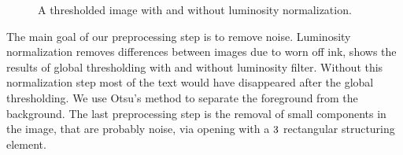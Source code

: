 \begin{figure}[b!]
	\centering
	\hfil
	\caption{A thresholded image with \protect{} and without \protect{} luminosity normalization.}
	\label{fig:methods:preprocessing:lumNormalization}
\end{figure}

The main goal of our preprocessing step is to remove noise. 
Luminosity normalization removes differences between images due to worn off ink,  shows the results of global thresholding with and without luminosity filter. Without this normalization step most of the text would have disappeared after the global thresholding. 
We use Otsu's \cite{otsu1975threshold} method to separate the foreground from the background. 
The last preprocessing step is the removal of small components in the image, that are probably noise, via opening with a $3 \time 3$ rectangular structuring element.

